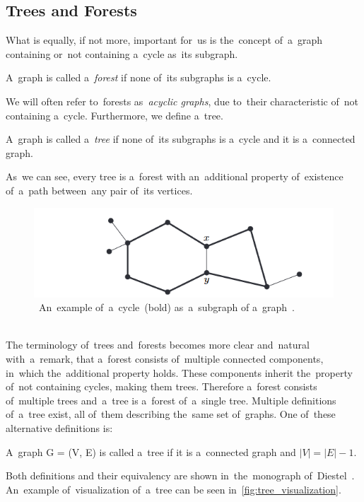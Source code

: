\subsection{Trees and Forests}
What is equally, if not more, important for~us is the~concept of~a~graph containing or~not containing a~cycle as~its subgraph.
\begin{definition}[Forest]
    A~graph is called a~\emph{forest} if none of~its subgraphs is a~cycle.
\end{definition}
We will often refer to~forests as~\textit{acyclic graphs}, due to~their characteristic of~not containing a~cycle. Furthermore, we define a~tree.
\label{TreeDefinition}
\begin{definition}[Tree]
    A~graph is called a~\emph{tree} if none of~its subgraphs is a~cycle and it is a~connected graph.
\end{definition}
As~we can see, every tree is a~forest with an~additional property of~existence of~a~path between~any pair of~its vertices.
\begin{figure}[h]
    \centering
    \includegraphics[width=0.75\linewidth]{cycle_example.png}
    \caption[An~example of~a~cycle as~a~subgraph of a~graph]{~An~example of~a~cycle~(bold) as~a~subgraph of a~graph~\cite{Diestel}.}
    \label{fig:cycles_visualization}
\end{figure}
\\
The terminology of~trees and~forests becomes more clear and~natural with~a~remark, that a~forest consists of~multiple connected components, in~which the~additional property holds. These components inherit the~property of~not containing cycles, making them trees. Therefore a~forest consists of~multiple trees and~a~tree is a~forest of~a~single tree.
Multiple definitions of~a~tree exist, all of~them describing the~same set of~graphs.
One of~these alternative definitions is:
\begin{definition}[Tree]
    A~graph G = (V, E) is called a~tree if it is a~connected graph and $|V| = |E| - 1$.
\end{definition}
Both definitions and their equivalency are shown in~the~monograph of~Diestel~\cite{Diestel}. \\
An~example of~visualization of~a~tree can be seen in~\autoref{fig:tree_visualization}.
